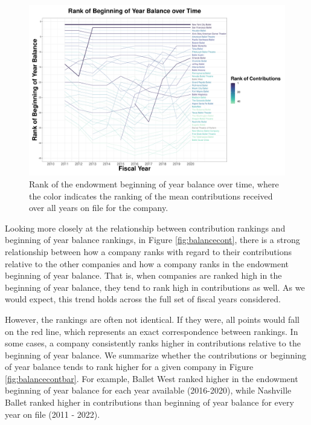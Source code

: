 \documentclass[Dance Data
Project,article,submit,moreauthors,pdftex]{mdpi}
\begin{document}
\begin{figure}[H]
\includegraphics[width=0.9\linewidth,]{../images/rank-endowments-color-contribution} \caption{\label{fig:rank-endowments-color-contribution}Rank of the endowment beginning of year balance over time, where the color indicates the ranking of the mean contributions received over all years on file for the company.}\label{fig:unnamed-chunk-4}
\end{figure}

Looking more closely at the relationship between contribution rankings
and beginning of year balance rankings, in Figure \ref{fig:balancecont},
there is a strong relationship between how a company ranks with regard
to their contributions relative to the other companies and how a company
ranks in the endowment beginning of year balance. That is, when
companies are ranked high in the beginning of year balance, they tend to
rank high in contributions as well. As we would expect, this trend holds
across the full set of fiscal years considered.

However, the rankings are often not identical. If they were, all points
would fall on the red line, which represents an exact correspondence
between rankings. In some cases, a company consistently ranks higher in
contributions relative to the beginning of year balance. We summarize
whether the contributions or beginning of year balance tends to rank
higher for a given company in Figure \ref{fig:balancecontbar}. For
example, Ballet West ranked higher in the endowment beginning of year
balance for each year available (2016-2020), while Nashville Ballet
ranked higher in contributions than beginning of year balance for every
year on file (2011 - 2022).
\end{document}
